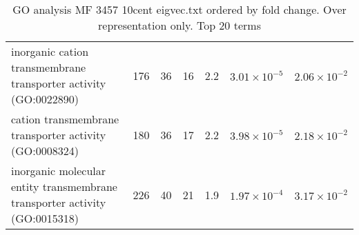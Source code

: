 \begin{table}[ht]
\begin{adjustbox}{width=\textwidth}
\begin{tabular}{lrrrrrr}
  inorganic cation transmembrane transporter activity (GO:0022890) & 176 & 36 & 16 & 2.2 & $3.01 \times 10^{-5}$ & $2.06 \times 10^{-2}$ \\ 
  cation transmembrane transporter activity (GO:0008324) & 180 & 36 & 17 & 2.2 & $3.98 \times 10^{-5}$ & $2.18 \times 10^{-2}$ \\ 
  inorganic molecular entity transmembrane transporter activity (GO:0015318) & 226 & 40 & 21 & 1.9 & $1.97 \times 10^{-4}$ & $3.17 \times 10^{-2}$ \\ 
   \hline
\end{tabular}
\end{adjustbox}
\caption{GO analysis MF 3457 10cent eigvec.txt ordered by fold change. Over representation only. Top 20 terms} 
\label{tab:GO analysis MF 3457 10cent eigvec.txt ordered by fold change. Over representation only. Top 20 terms}
\end{table}


